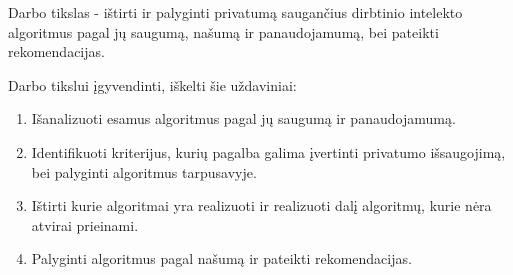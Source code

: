\documentclass{VUMIFInfBakalaurinis}
\begin{document}
	\par Darbo tikslas - ištirti ir palyginti privatumą saugančius dirbtinio intelekto algoritmus pagal jų saugumą, našumą ir panaudojamumą, bei pateikti rekomendacijas.
	\par Darbo tikslui įgyvendinti, iškelti šie uždaviniai:
	\begin{enumerate}
		\item Išanalizuoti esamus algoritmus pagal jų saugumą ir panaudojamumą.
		\item Identifikuoti kriterijus, kurių pagalba galima įvertinti privatumo išsaugojimą, bei palyginti algoritmus tarpusavyje.
		\item Ištirti kurie algoritmai yra realizuoti ir realizuoti dalį algoritmų, kurie nėra atvirai prieinami.
		\item Palyginti algoritmus pagal našumą ir pateikti rekomendacijas.
	\end{enumerate}
\end{document}
